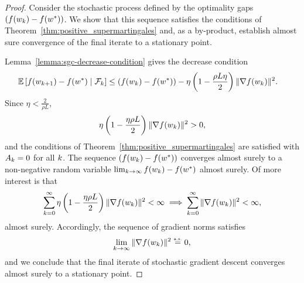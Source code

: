 \sgcAlmostSure*
\begin{proof}
    Consider the stochastic process defined by the optimality gaps \( \left(f(w_k) - f(w^*)\right) \).
    We show that this sequence satisfies the conditions of Theorem~\ref{thm:positive_supermartingales} and, as a by-product, establish almost sure convergence of the final iterate to a stationary point.

    Lemma~\ref{lemma:sgc-decrease-condition} gives the decrease condition
    \begin{align*}
        \mathbb{E} \left[f(w_{k+1}) - f(w^*) \mid \mathcal{F}_k\right] &\leq \left(f(w_k) - f(w^*)\right) - \eta \left(1 - \frac{\rho L \eta}{2}\right)\|\nabla f(w_k)\|^2.
    \end{align*}
    Since \( \eta < \frac{2}{\rho L} \),
    \begin{align*}
        \eta \left(1 - \frac{\eta \rho L}{2}\right)\|\nabla f(w_k)\|^2 > 0,
    \end{align*}
    and the conditions of Theorem~\ref{thm:positive_supermartingales} are satisfied with \( A_k = 0 \) for all \( k \).
    The sequence \( \left(f(w_k) - f(w^*)\right) \) converges almost surely to a non-negative random variable \(\lim_{k \rightarrow \infty} f(w_k) - f(w^*) \) almost surely.
    Of more interest is that
    \begin{align*}
        \sum_{k=0}^{\infty} \eta \left(1 - \frac{\eta \rho L}{2}\right) \|\nabla f(w_k)\|^2 < \infty
        \implies \sum_{k=0}^{\infty} \|\nabla f(w_k)\|^2 < \infty,
    \end{align*}
    almost surely.
    Accordingly, the sequence of gradient norms satisfies
    \[ \lim_{k \rightarrow \infty} \|\nabla f(w_k)\|^2 \stackrel{\text{\rm\tiny a.s.}}{=} 0, \]
    and we conclude that the final iterate of stochastic gradient descent converges almost surely to a stationary point.
\end{proof}












